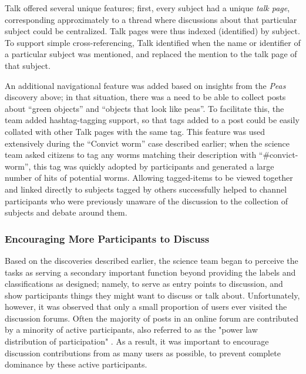 \documentclass{sigchi}
\begin{document}
Talk offered several unique features; first, every subject had a unique \emph{talk page}, corresponding approximately to a thread where discussions about that particular subject could be centralized.  Talk pages were thus indexed (identified) by subject.  To support simple cross-referencing, Talk identified when the name or identifier of a particular subject was mentioned, and replaced the mention to the talk page of that subject.  

An additional navigational feature was added based on insights from the \emph{Peas} discovery above; in that situation, there was a need to be able to collect posts about ``green objects'' and ``objects that look like peas''.  To facilitate this, the team added hashtag-tagging support, so that tags added to a post could be easily collated with other Talk pages with the same tag.   This feature was used extensively during the ``Convict worm'' case described earlier; when the science team asked citizens to tag any worms matching their description with ``\#convict-worm'', this tag was quickly adopted by participants and generated a large number of hits of potential worms.  Allowing tagged-items to be viewed together and linked directly to subjects tagged by others successfully helped to channel participants who were previously unaware of the discussion to the collection of subjects and debate around them.

\subsubsection{Encouraging More Participants to Discuss}

Based on the discoveries described earlier, the science team began to perceive the tasks as serving a secondary important function beyond providing the labels and classifications as designed; namely, to serve as entry points to discussion, and show participants things they might want to discuss or talk about.   %
Unfortunately, however, it was observed that only a small proportion of users ever visited the discussion forums. Often the majority of posts in an online forum are contributed by a minority of active participants, also referred to as the "power law distribution of participation" \cite{lampe2010motivations}. As a result, it was important to encourage discussion contributions from as many users as possible, to prevent complete dominance by these active participants.
\end{document}
